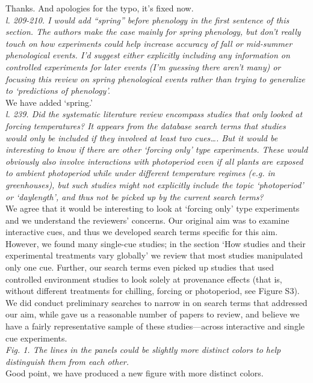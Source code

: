 \documentclass[11pt,letter]{article}
\begin{document}
Thanks. And apologies for the typo, it's fixed now.\\

\emph{l. 209-210. I would add “spring” before phenology in the first sentence of this section. The authors make the case mainly for spring phenology, but don't really touch on how experiments could help increase accuracy of fall or mid-summer phenological events. I'd suggest either explicitly including any information on controlled experiments for later events (I'm guessing there aren't many) or focusing this review on spring phenological events rather than trying to generalize to ‘predictions of phenology'.  }\\

We have added `spring.'\\

\emph{l. 239. Did the systematic literature review encompass studies that only looked at forcing temperatures? It appears from the database search terms that studies would only be included if they involved at least two cues…. But it would be interesting to know if there are other `forcing only' type experiments. These would obviously also involve interactions with photoperiod even if all plants are exposed to ambient photoperiod while under different temperature regimes (e.g. in greenhouses), but such studies might not explicitly include the topic `photoperiod' or `daylength', and thus not be picked up by the current search terms? }\\

We agree that it would be interesting to look at `forcing only' type experiments and we understand the reviewers' concerns. Our original aim was to examine interactive cues, and thus we developed search terms specific for this aim. However, we found many single-cue studies; in the section `How studies and their experimental treatments vary globally' we review that most studies manipulated only one cue. Further, our search terms even picked up studies that used controlled environment studies to look solely at provenance effects (that is, without different treatments for chilling, forcing or photoperiod, see Figure S3). We did conduct preliminary searches to narrow in on search terms that addressed our aim, while gave us a reasonable number of papers to review, and believe we have a fairly representative sample of these studies---across interactive and single cue experiments. \\

\emph{Fig. 1. The lines in the panels could be slightly more distinct colors to help distinguish them from each other.}\\

Good point, we have produced a new figure with more distinct colors.


\end{document}
